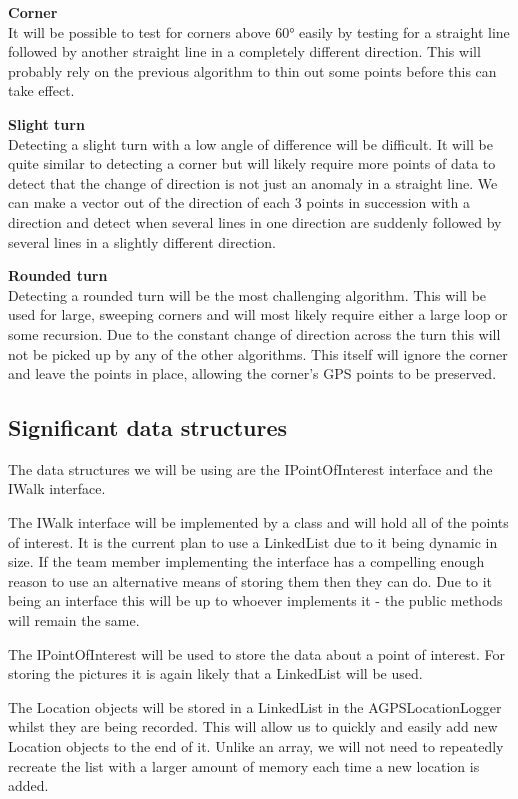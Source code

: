 \documentclass{project}
\begin{document}
\textbf{Corner} \\
It will be possible to test for corners above 60° easily by testing for a
straight line followed by another straight line in a completely different
direction. This will probably rely on the previous algorithm to thin out some
points before this can take effect.

\textbf{Slight turn} \\
Detecting a slight turn with a low angle of difference will be difficult. It
will be quite similar to detecting a corner but will likely require more points
of data to detect that the change of direction is not just an anomaly in a
straight line. We can make a vector out of the direction of each 3 points in
succession with a direction and detect when several lines in one direction are
suddenly followed by several lines in a slightly different direction.

\textbf{Rounded turn} \\
Detecting a rounded turn will be the most challenging algorithm. This will be
used for large, sweeping corners and will most likely require either a large
loop or some recursion. Due to the constant change of direction across the turn
this will not be picked up by any of the other algorithms. This itself will
ignore the corner and leave the points in place, allowing the corner's GPS
points to be preserved.

\subsection{Significant data structures}
The data structures we will be using are the IPointOfInterest interface and the
IWalk interface.

The IWalk interface will be implemented by a class and will hold all of the
points of interest. It is the current plan to use a LinkedList due to it being
dynamic in size. If the team member implementing the interface has a compelling
enough reason to use an alternative means of storing them then they can do. Due
to it being an interface this will be up to whoever implements it - the public
methods will remain the same.

The IPointOfInterest will be used to store the data about a point of interest.
For storing the pictures it is again likely that a LinkedList will be used.

The Location objects will be stored in a LinkedList in the AGPSLocationLogger
whilst they are being recorded. This will allow us to quickly and easily add
new Location objects to the end of it. Unlike an array, we will not need to
repeatedly recreate the list with a larger amount of memory each time a new
location is added.
\end{document}

